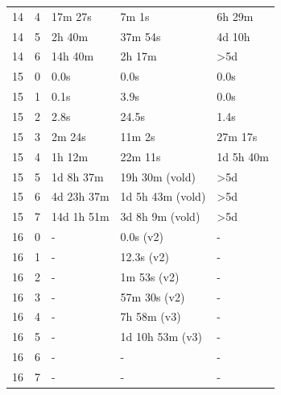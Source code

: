 \documentclass[10pt,journal,compsoc]{IEEEtran}
\begin{document}
\begin{table}[!t]
\begin{tabular}{c|c|l|l|l}
    14  & 4   & 17m 27s                 & 7m 1s                    & 6h 29m           \\
    14  & 5   & 2h 40m                  & 37m 54s                  & 4d 10h           \\
    14  & 6   & 14h 40m                 & 2h 17m                   & >5d              \\
    \hline
    15  & 0   & 0.0s                    & 0.0s                     & 0.0s             \\
    15  & 1   & 0.1s                    & 3.9s                     & 0.0s             \\
    15  & 2   & 2.8s                    & 24.5s                    & 1.4s             \\
    15  & 3   & 2m 24s                  & 11m 2s                   & 27m 17s          \\
    15  & 4   & 1h 12m                  & 22m 11s                  & 1d 5h 40m        \\
    15  & 5   & 1d 8h 37m               & 19h 30m (vold)           & >5d              \\
    15  & 6   & 4d 23h 37m              & 1d 5h 43m (vold)         & >5d              \\
    15  & 7   & 14d 1h 51m              & 3d 8h 9m (vold)          & >5d              \\
    \hline
    16  & 0   & -                       & 0.0s (v2)                & -                \\
    16  & 1   & -                       & 12.3s (v2)               & -                \\
    16  & 2   & -                       & 1m 53s (v2)              & -                \\
    16  & 3   & -                       & 57m 30s (v2)             & -                \\
    16  & 4   & -                       & 7h 58m (v3)              & -                \\
    16  & 5   & -                       & 1d 10h 53m (v3)          & -                \\
    16  & 6   & -                       & -                        & -                \\
    16  & 7   & -                       & -                        & -                \\
  \end{tabular}
\end{table}
\end{document}
